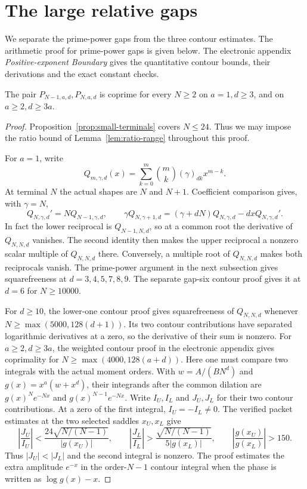 \section{The large relative gaps}
\label{app:positive-boundary}

We separate the prime-power gaps from the three contour estimates.
The arithmetic proof for prime-power gaps is given below. The
electronic appendix \textit{Positive-exponent Boundary} gives the
quantitative contour bounds, their derivations and the exact
constant checks.

\begin{lemma}
\label{lem:positive-boundary}
The pair \(P_{N-1,a,d},P_{N,a,d}\) is coprime for every \(N\ge2\)
on \(a=1,d\ge3\), and on \(a\ge2,d\ge3a\).
\end{lemma}

\begin{proof}
Proposition~\ref{prop:small-terminals} covers \(N\le24\).
Thus we may impose the ratio bound of Lemma~\ref{lem:ratio-range}
throughout this proof.

For \(a=1\), write
\[
 Q_{m,\gamma,d}(x)=\sum_{k=0}^m\binom{m}{k}
                        (\gamma)_{dk}x^{m-k}.
\]
At terminal \(N\) the actual shapes are \(N\) and \(N+1\).
Coefficient comparison gives, with \(\gamma=N\),
\[
 Q_{N,\gamma,d}'=NQ_{N-1,\gamma,d},\qquad
 \gamma Q_{N,\gamma+1,d}
  =(\gamma+dN)Q_{N,\gamma,d}-dxQ_{N,\gamma,d}'.
\]
In fact the lower reciprocal is \(Q_{N-1,N,d}\), so at a
common root the derivative of \(Q_{N,N,d}\) vanishes. The second
identity then makes the upper reciprocal a nonzero scalar multiple
of \(Q_{N,N,d}\) there. Conversely, a multiple root of
\(Q_{N,N,d}\) makes both reciprocals vanish. The prime-power
argument in the next subsection gives squarefreeness at
\(d=3,4,5,7,8,9\). The separate
gap-six contour proof gives it at \(d=6\) for \(N\ge10000\).

For \(d\ge10\), the lower-one contour proof gives squarefreeness of
\(Q_{N,N,d}\) whenever \(N\ge\max(5000,128(d+1))\).
Its two contour contributions have separated logarithmic
derivatives at a zero, so the derivative of their sum is nonzero.
For \(a\ge2,d\ge3a\), the weighted contour proof in the electronic
appendix gives coprimality for \(N\ge\max(4000,128(a+d))\).
Here one must compare two integrals with the actual moment orders.
With \(w=A/(BN^d)\) and \(g(x)=x^a(w+x^d)\), their integrands
after the common dilation are \(g(x)^N e^{-Nx}\) and
\(g(x)^{N-1}e^{-Nx}\). Write \(I_U,I_L\) and \(J_U,J_L\)
for their two contour contributions. At a zero of the first
integral, \(I_U=-I_L\ne0\). The verified packet estimates at the
two selected saddles \(x_U,x_L\) give
\[
 \left|\frac{J_U}{I_U}\right|
 <\frac{24\sqrt{N/(N-1)}}{|g(x_U)|},\qquad
 \left|\frac{J_L}{I_L}\right|
 >\frac{\sqrt{N/(N-1)}}{5|g(x_L)|},\qquad
 \left|\frac{g(x_U)}{g(x_L)}\right|>150 .
\]
Thus \(|J_U|<|J_L|\) and the second integral is nonzero.
The proof estimates the extra amplitude \(e^{-x}\) in the
order-\(N-1\) contour integral when the phase is written as
\(\log g(x)-x\).


\end{proof}
